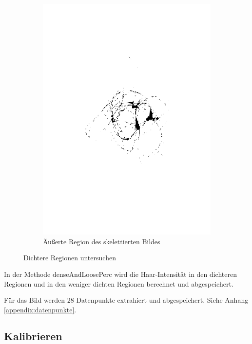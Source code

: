 \documentclass[german,a4paper, 12pt]{scrartcl}
\begin{document}
\begin{figure}
\begin{subfigure}[b]{0.475\textwidth}
		\includegraphics[width=\textwidth]{fig64/09outer section.png}
		\caption[]{Äußerte Region des skelettierten Bildes}
		\label{img:skel}
	\end{subfigure}
	\caption[  ]
	{\small Dichtere Regionen untersuchen} 
	\label{img:tstM}
\end{figure}

In der Methode denseAndLoosePerc wird die Haar-Intensität in den dichteren Regionen und in den weniger dichten Regionen berechnet und abgespeichert.

Für das Bild werden 28 Datenpunkte extrahiert und abgespeichert. Siehe Anhang \ref{appendix:datenpunkte}. 



\subsection{Kalibrieren}
\end{document}
